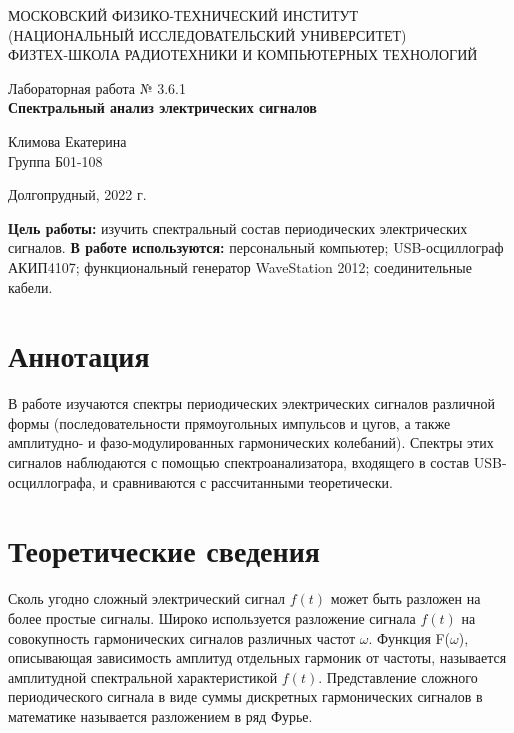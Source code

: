 \documentclass[a4paper,12pt]{article} %
\begin{document}
\begin{center}
	\footnotesize{МОСКОВСКИЙ ФИЗИКО-ТЕХНИЧЕСКИЙ ИНСТИТУТ\\(НАЦИОНАЛЬНЫЙ 			ИССЛЕДОВАТЕЛЬСКИЙ УНИВЕРСИТЕТ)}\\
	\footnotesize{ФИЗТЕХ-ШКОЛА РАДИОТЕХНИКИ И КОМПЬЮТЕРНЫХ ТЕХНОЛОГИЙ\\}
	\hfill \break
	\hfill \break
	\hfill \break
	\hfill \break
	\hfill \break
	\hfill \break
\end{center}

\begin{center}   
    \hfill \break
	\hfill \break
	\hfill \break
	\hfill \break
	\hfill \break
	\hfill \break
	\hfill \break
	\hfill \break
	\hfill \break
	\hfill \break
	\hfill \break
	\large{Лабораторная работа № 3.6.1\\\large{\textbf{Спектральный анализ электрических сигналов}}}\\
	\hfill \break
	\hfill \break
	\hfill \break
	\hfill \break
	\hfill \break
	\hfill \break
	\hfill \break
	\hfill \break
	\hfill \break
	\hfill \break
	\hfill \break
	\begin{flushright}
		Климова Екатерина\\
		Группа Б01-108
	\end{flushright}
	\hfill \break
\end{center}
\hfill \break
\hfill \break
\begin{center}
	Долгопрудный, 2022 г.
\end{center}
\thispagestyle{empty}

\newpage
\hfill \break
\textbf{Цель работы:} изучить спектральный состав периодических электрических сигналов.
\hfill \break
\hfill \break
\textbf{В работе используются:} персональный компьютер; USB-осциллограф АКИП4107; функциональный генератор WaveStation 2012; соединительные кабели.

\section{Аннотация}
\hfill \break
В работе изучаются спектры периодических электрических сигналов различной формы (последовательности прямоугольных импульсов и цугов, а также амплитудно- и фазо-модулированных гармонических колебаний). Спектры этих сигналов наблюдаются с помощью спектроанализатора, входящего в состав USB-осциллографа, и сравниваются с рассчитанными теоретически.

\section{Теоретические сведения}
\hfill \break
Сколь угодно сложный электрический сигнал $f(t)$ может быть разложен на более простые сигналы. Широко используется разложение сигнала $f(t)$ на совокупность гармонических сигналов различных частот $\omega$. Функция F($\omega$), описывающая зависимость амплитуд отдельных гармоник от частоты, называется амплитудной спектральной характеристикой $f(t)$. Представление сложного периодического сигнала в виде суммы дискретных гармонических сигналов в математике называется разложением в ряд Фурье.
\end{document}
